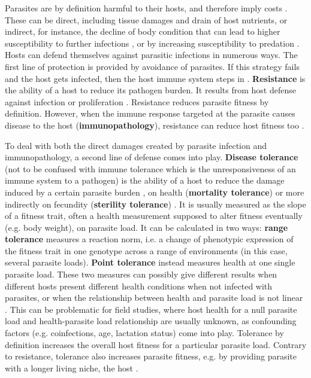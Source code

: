Parasites are by definition harmful to their hosts, and therefore imply costs \citep{noauthor_parasitism_2019}. These can be direct, including tissue damages and drain of host nutrients, or indirect, for instance, the decline of body condition that can lead to higher susceptibility to further infections \citep{beldomenico_poor_2008}, or by increasing susceptibility to predation \citep{bakker_parasite-induced_1997, ostlund-nilsson_parasitic_2005}. Hosts can defend themselves against parasitic infections in numerous ways. The first line of protection is provided by avoidance of parasites. If this strategy fails and the host gets infected, then the host immune system steps in \citep{schmid-hempel_evolutionary_2013}. \textbf{Resistance} is the ability of a host to reduce its pathogen burden. It results from host defense against infection or proliferation \citep{raaberg_decomposing_2009}. Resistance reduces parasite fitness by definition. However, when the immune response targeted at the parasite causes disease to the host (\textbf{immunopathology}), resistance can reduce host fitness too \citep{graham_evolutionary_2005}. 
\par
To deal with both the direct damages created by parasite infection and immunopathology, a second line of defense comes into play. \textbf{Disease tolerance} (not to be confused with immune tolerance which is the unresponsiveness of an immune system to a pathogen) is the ability of a host to reduce the damage induced by a certain parasite burden \citep{raaberg_decomposing_2009}, on health (\textbf{mortality tolerance}) or more indirectly on fecundity (\textbf{sterility tolerance}) \citep{best_maintenance_2008}. It is usually measured as the slope of a fitness trait, often a health measurement supposed to alter fitness eventually (e.g. body weight), on parasite load. It can be calculated in two ways: \textbf{range tolerance} measures a reaction norm, i.e. a change of phenotypic expression of the fitness trait in one genotype across a range of environments (in this case, several parasite loads). \textbf{Point tolerance} instead measures health at one single parasite load. These two measures can possibly give different results when different hosts present different health conditions when not infected with parasites, or when the relationship between health and parasite load is not linear \citep{little_coevolution_2010}. This can be problematic for field studies, where host health for a null parasite load and health-parasite load relationship are usually unknown, as confounding factors (e.g. coinfections, age, lactation status) come into play. Tolerance by definition increases the overall host fitness for a particular parasite load. Contrary to resistance, tolerance also increases parasite fitness, e.g. by providing parasite with a longer living niche, the host \citep{kutzer_maximising_2016, miller_evolution_2006, roy_evolutionary_2000}. 
